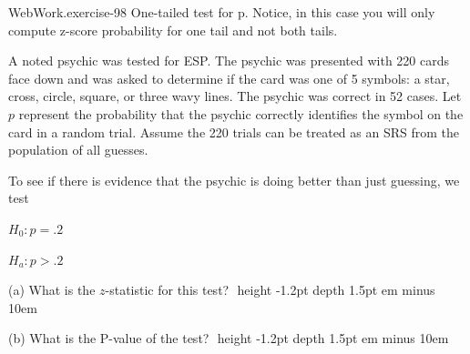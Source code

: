 \documentclass[10pt,]{book}
\newcommand{\fillin}[1]{\leavevmode\leaders\vrule height -1.2pt depth 1.5pt \hskip #1em minus #1em \null}
\numberwithin{equation}{section}
\begin{document}
%
\par
\hypertarget{p-1385}{}%
\begin{inlineexercise}{WebWork.}{exercise-98}%
\hypertarget{p-1386}{}%
One-tailed test for p. Notice, in this case you will only compute z-score probability for one tail and not both tails.%
\par\medskip
\hypertarget{p-1387}{}%
A noted psychic was tested for ESP.  The psychic was presented with 220 cards face down and was asked to determine if the card was one of 5 symbols: a star, cross, circle, square, or three wavy lines.  The psychic was correct in 52 cases.  Let \(p\) represent the probability that the psychic correctly identifies the symbol on the card in a random trial. Assume the 220 trials can be treated as an SRS from the population of all guesses.%
\par
\hypertarget{p-1388}{}%
To see if there is evidence that the psychic is doing better than just guessing, we test%
\par
\hypertarget{p-1389}{}%
\(H_0: p = .2\)%
\par
\hypertarget{p-1390}{}%
\(H_a: p > .2\)%
\par
\hypertarget{p-1391}{}%
(a) What is the \(z\)-statistic for this test? \(\)  \fillin{10}%
\par
\hypertarget{p-1392}{}%
(b) What is the P-value of the test?  \(\)  \fillin{10}%
\end{inlineexercise}
%
%
%
\typeout{************************************************}
\typeout{************************************************}
%
\end{document}
